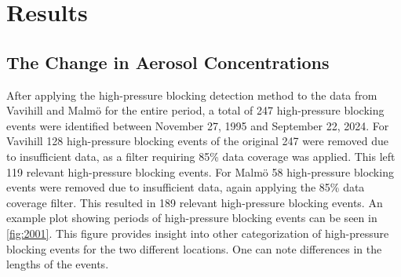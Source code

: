 \newpage
\section{Results}
\subsection{The Change in Aerosol Concentrations}
After applying the high-pressure blocking detection method to the data from Vavihill and Malmö for the entire period, a total of 247 high-pressure blocking events were identified between November 27, 1995 and September 22, 2024. For Vavihill 128 high-pressure blocking events of the original 247 were removed due to insufficient \PM data, as a filter requiring 85\% data coverage was applied. This left 119 relevant high-pressure blocking events. For Malmö 58 high-pressure blocking events were removed due to insufficient \PM data, again applying the 85\% data coverage filter. This resulted in 189 relevant high-pressure blocking events. An example plot showing periods of high-pressure blocking events can be seen in \autoref{fig:2001}. This figure provides insight into other categorization of high-pressure blocking events for the two different locations. One can note differences in the lengths of the events. 

